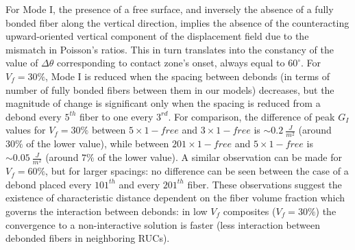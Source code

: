 \documentclass[review]{elsarticle}
\begin{document}
For Mode I, the presence of a free surface, and inversely the absence of a fully bonded fiber along the vertical direction, implies the absence of the counteracting upward-oriented vertical component of the displacement field due to the mismatch in Poisson's ratios. This in turn translates into the constancy of the value of $\Delta\theta$ corresponding to contact zone's onset, always equal to $60^{\circ}$. For $V_{f}=30\%$, Mode I is reduced when the spacing between debonds (in terms of number of fully bonded fibers between them in our models) decreases, but the magnitude of change is significant only when the spacing is reduced from a debond every $5^{th}$ fiber to one every $3^{rd}$. For comparison, the difference of peak $G_{I}$ values for $V_{f}=30\%$ between $5\times 1-free$ and $3\times 1-free$ is $\sim 0.2\ \frac{J}{m^{2}}$ (around $30\%$ of the lower value), while between $201\times 1-free$ and $5\times 1-free$ is $\sim 0.05\ \frac{J}{m^{2}}$ (around $7\%$ of the lower value). A similar observation can be made for $V_{f}=60\%$, but for larger spacings: no difference can be seen between the case of a debond placed every $101^{th}$ and every $201^{th}$ fiber. These observations suggest the existence of characteristic distance dependent on the fiber volume fraction which governs the interaction between debonds: in low $V_{f}$ composites ($V_{f}=30\%$) the convergence to a non-interactive solution is faster (less interaction between debonded fibers in neighboring RUCs).
\end{document}
